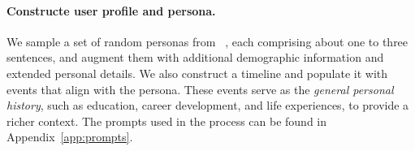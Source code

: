 


\paragraph{Constructe user profile and persona.}
We sample a set of random personas from \personahub~\citep{ge2024scaling}, each comprising about one to three sentences, and augment them with additional demographic information and extended personal details. We also construct a timeline and populate it with events that align with the persona. These events serve as the \textit{general personal history}, such as education, career development, and life experiences, to provide a richer context. The prompts used in the process can be found in Appendix~\ref{app:prompts}.




